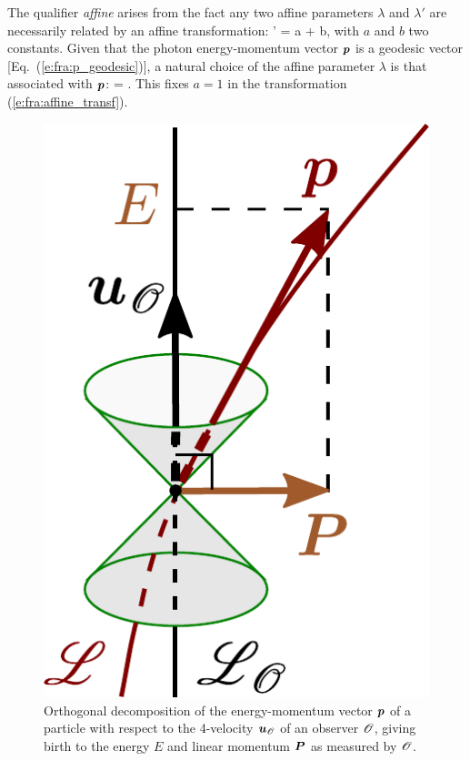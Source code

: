 The qualifier \emph{affine} arises from the fact any two affine parameters
$\lambda$ and $\lambda'$ are necessarily related by an affine transformation:
\be \label{e:fra:affine_transf}
    \lambda' = a \lambda + b,
\ee
with $a$ and $b$ two constants.
Given that the photon energy-momentum vector $\bm{p}$ is a geodesic vector
[Eq.~(\ref{e:fra:p_geodesic})],
a natural choice of the affine parameter $\lambda$ is that associated with
$\bm{p}$:
\be \label{e:fra:p_dxdl}
     =  .
\ee
This fixes $a=1$ in the transformation (\ref{e:fra:affine_transf}).


\begin{figure}
\centerline{\includegraphics[height=0.3\textheight]{fra_energy_momentum.pdf}}
\caption[]{\label{f:fra:energy_momentum} \footnotesize
Orthogonal decomposition of the energy-momentum vector $\bm{p}$ of a particle
with respect to the 4-velocity $\bm{u}_{\mathscr{O}}$ of an observer $\mathscr{O}$,
giving birth to the energy $E$ and linear momentum $\bm{P}$ as measured by $\mathscr{O}$.}
\end{figure}



